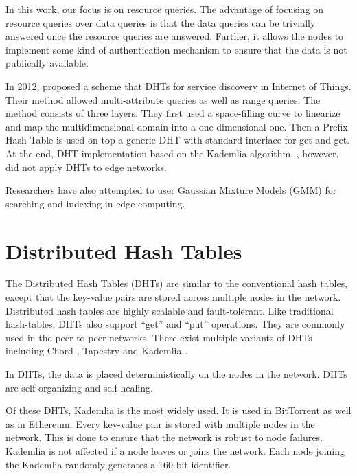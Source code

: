 In this work, our focus is on resource queries. The advantage of focusing on
resource queries over data queries is that the data queries can be trivially
answered once the resource queries are answered. Further, it allows the nodes to
implement some kind of authentication mechanism to ensure that the data is not
publically available.


In 2012, \citet{federicapaganelliDHTBasedDiscoveryService2012} proposed a scheme
that DHTs for service discovery in Internet of Things. Their method allowed
multi-attribute queries as well as range queries. The method consists of three
layers. They first used a space-filling curve to linearize and map the
multidimensional domain into a one-dimensional one. Then a Prefix-Hash Table is
used on top a generic DHT with standard interface for get and get. At the end,
DHT implementation based on the Kademlia algorithm.
\citet{federicapaganelliDHTBasedDiscoveryService2012}, however, did not apply
DHTs to edge networks.

Researchers have also attempted to user Gaussian Mixture Models (GMM) for
searching and indexing in edge computing.


\section{Distributed Hash Tables}

The Distributed Hash Tables (DHTs) are similar to the conventional hash tables,
except that the key-value pairs are stored across multiple nodes in the network.
Distributed hash tables are highly scalable and fault-tolerant. Like traditional
hash-tables, DHTs also support ``get'' and ``put'' operations. They are commonly
used in the peer-to-peer networks. There exist multiple variants of DHTs
including Chord \cite{ChordScalablePeertopeer}, Tapestry
\cite{zhaoTapestryResilientGlobalscale2004} and Kademlia
\cite{petarmaymounkovKademliaPeertoPeerInformation2002}.

In DHTs, the data is placed deterministically on the nodes in the network. DHTs
are self-organizing and self-healing.

Of these DHTs, Kademlia is the most widely used. It is used in BitTorrent
\cite{andrewloewensternDHTProtocol2008} as well as in Ethereum. Every key-value
pair is stored with multiple nodes in the network. This is done to ensure that
the network is robust to node failures. Kademlia is not affected if a node
leaves or joins the network. Each node joining the Kademlia randomly generates a
160-bit identifier.
\cite{petarmaymounkovKademliaPeertoPeerInformation2002}

